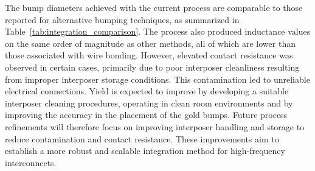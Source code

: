 \documentclass[conference,a4paper]{IEEEtran}
\begin{document}
The bump diameters achieved with the current process are comparable to those reported for alternative bumping techniques, as summarized in Table~\ref{tab:integration_comparison}. The process also produced inductance values on the same order of magnitude as other methods, all of which are lower than those associated with wire bonding. However, elevated contact resistance was observed in certain cases, primarily due to poor interposer cleanliness resulting from improper interposer storage conditions. This contamination led to unreliable electrical connections. Yield is expected to improve by developing a suitable interposer cleaning procedures, operating in clean room environments and by improving the accuracy in the placement of the gold bumps. Future process refinements will therefore focus on improving interposer handling and storage to reduce contamination and contact resistance. These improvements aim to establish a more robust and scalable integration method for high-frequency interconnects.
\end{document}
